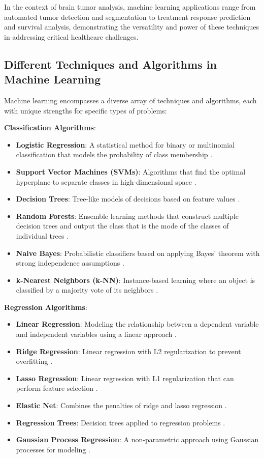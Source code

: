 In the context of brain tumor analysis, machine learning applications range from automated tumor detection and segmentation to treatment response prediction and survival analysis, demonstrating the versatility and power of these techniques in addressing critical healthcare challenges.

\subsection{Different Techniques and Algorithms in Machine Learning}
\label{sec:ml_techniques}
Machine learning encompasses a diverse array of techniques and algorithms, each with unique strengths for specific types of problems:

\textbf{Classification Algorithms}:
\begin{itemize}
  \item \textbf{Logistic Regression}: A statistical method for binary or multinomial classification that models the probability of class membership \cite{hosmer2013applied}.
  \item \textbf{Support Vector Machines (SVMs)}: Algorithms that find the optimal hyperplane to separate classes in high-dimensional space \cite{cortes1995support}.
  \item \textbf{Decision Trees}: Tree-like models of decisions based on feature values \cite{quinlan1986induction}.
  \item \textbf{Random Forests}: Ensemble learning methods that construct multiple decision trees and output the class that is the mode of the classes of individual trees \cite{breiman2001random}.
  \item \textbf{Naive Bayes}: Probabilistic classifiers based on applying Bayes' theorem with strong independence assumptions \cite{rish2001empirical}.
  \item \textbf{k-Nearest Neighbors (k-NN)}: Instance-based learning where an object is classified by a majority vote of its neighbors \cite{cover1967nearest}.
\end{itemize}

\textbf{Regression Algorithms}:
\begin{itemize}
  \item \textbf{Linear Regression}: Modeling the relationship between a dependent variable and independent variables using a linear approach \cite{montgomery2021introduction}.
  \item \textbf{Ridge Regression}: Linear regression with L2 regularization to prevent overfitting \cite{hoerl1970ridge}.
  \item \textbf{Lasso Regression}: Linear regression with L1 regularization that can perform feature selection \cite{tibshirani1996regression}.
  \item \textbf{Elastic Net}: Combines the penalties of ridge and lasso regression \cite{zou2005regularization}.
  \item \textbf{Regression Trees}: Decision trees applied to regression problems \cite{breiman1984classification}.
  \item \textbf{Gaussian Process Regression}: A non-parametric approach using Gaussian processes for modeling \cite{rasmussen2003gaussian}.
\end{itemize}

